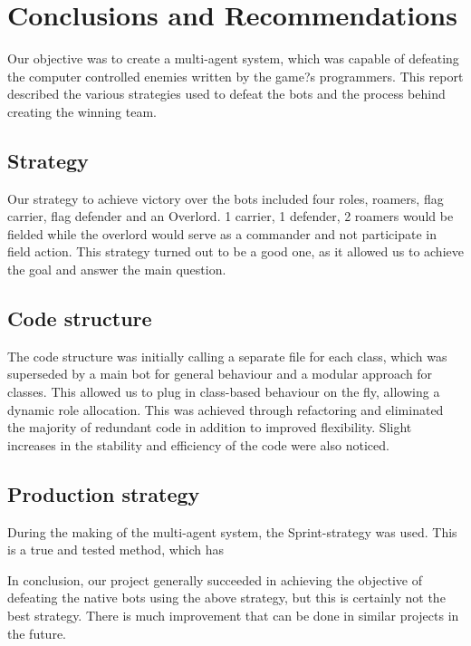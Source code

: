\chapter{Conclusions and Recommendations}

Our objective was to create a multi-agent system, which was capable of defeating the computer controlled enemies written by the game?s programmers. This report described the various strategies used to defeat the bots and the process behind creating the winning team.
    
\section{Strategy}
Our strategy to achieve victory over the bots included four roles, roamers, flag carrier, flag defender and an Overlord. 1 carrier, 1 defender, 2 roamers would be fielded while the overlord would serve as a commander and not participate in field action. This strategy turned out to be a good one, as it allowed us to achieve the goal and answer the main question.

\section{Code structure}
The code structure was initially calling a separate file for each class, which was superseded by a main bot for general behaviour and a modular approach for classes. This allowed us to plug in class-based behaviour on the fly, allowing a dynamic role allocation. This was achieved through refactoring and eliminated the majority of redundant code in addition to improved flexibility. Slight increases in the stability and efficiency of the code were also noticed.

\section{Production strategy}
During the making of the multi-agent system, the Sprint-strategy was used. This is a true and tested method, which has 

In conclusion, our project generally succeeded in achieving the objective of defeating the native bots using the above strategy, but this is certainly not the best strategy. There is much improvement that can be done in similar projects in the future.